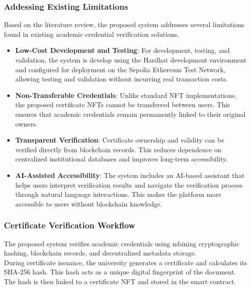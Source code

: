 \subsubsection{Addessing Existing Limitations}

Based on the literature review, the proposed system addresses several limitations found in existing academic credential verification solutions.

\begin{itemize}
    \item \textbf{Low-Cost Development and Testing}: For development, testing, and validation, the system is develop using the Hardhat development environment and configured for deployment on the Sepolia Ethereum Test Network, allowing testing and validation without incurring real transaction costs.

    \item \textbf{Non-Transferable Credentials}: Unlike standard NFT implementations, the proposed certificate NFTs cannot be transferred between users. This ensures that academic credentials remain permanently linked to their original owners.

    \item \textbf{Transparent Verification}: Certificate ownership and validity can be verified directly from blockchain records. This reduces dependence on centralized institutional databases and improves long-term accessibility.

    \item \textbf{AI-Assisted Accessibility}: The system includes an AI-based assistant that helps users interpret verification results and navigate the verification process through natural language interactions. This makes the platform more accessible to users without blockchain knowledge.
\end{itemize}


\subsubsection{Certificate Verification Workflow}

The proposed system verifies academic credentials using mbining cryptographic hashing, blockchain records, and decentralized metadata storage.\\

During certificate issuance, the university generates a certificate and calculates its SHA-256 hash. This hash acts as a unique digital fingerprint of the document. The hash is then linked to a certificate NFT and stored in the smart contract.\\

